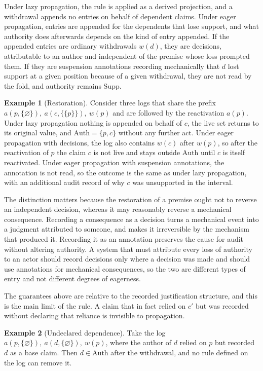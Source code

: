 \documentclass[11pt]{article}
\theoremstyle{plain}
\theoremstyle{definition}
\newtheorem{example}{Example}
\theoremstyle{remark}
\begin{document}
Under lazy propagation, the rule is applied as a derived projection, and a withdrawal appends no entries on behalf of dependent claims. Under eager propagation, entries are appended for the dependents that lose support, and what authority does afterwards depends on the kind of entry appended. If the appended entries are ordinary withdrawals $w(d)$, they are decisions, attributable to an author and independent of the premise whose loss prompted them. If they are suspension annotations recording mechanically that $d$ lost support at a given position because of a given withdrawal, they are not read by the fold, and authority remains $\mathrm{Supp}$.

\begin{example}[Restoration]
Consider three logs that share the prefix $a(p,\{\varnothing\}),\ a(c,\{\{p\}\}),\ w(p)$ and are followed by the reactivation $a(p)$. Under lazy propagation nothing is appended on behalf of $c$, the live set returns to its original value, and $\mathrm{Auth}=\{p,c\}$ without any further act. Under eager propagation with decisions, the log also contains $w(c)$ after $w(p)$, so after the reactivation of $p$ the claim $c$ is not live and stays outside $\mathrm{Auth}$ until $c$ is itself reactivated. Under eager propagation with suspension annotations, the annotation is not read, so the outcome is the same as under lazy propagation, with an additional audit record of why $c$ was unsupported in the interval.
\end{example}

The distinction matters because the restoration of a premise ought not to reverse an independent decision, whereas it may reasonably reverse a mechanical consequence. Recording a consequence as a decision turns a mechanical event into a judgment attributed to someone, and makes it irreversible by the mechanism that produced it. Recording it as an annotation preserves the cause for audit without altering authority. A system that must attribute every loss of authority to an actor should record decisions only where a decision was made and should use annotations for mechanical consequences, so the two are different types of entry and not different degrees of eagerness.

The guarantees above are relative to the recorded justification structure, and this is the main limit of the rule. A claim that in fact relied on $c'$ but was recorded without declaring that reliance is invisible to propagation.

\begin{example}[Undeclared dependence]
Take the log $a(p,\{\varnothing\}),\ a(d,\{\varnothing\}),\ w(p)$, where the author of $d$ relied on $p$ but recorded $d$ as a base claim. Then $d\in\mathrm{Auth}$ after the withdrawal, and no rule defined on the log can remove it.
\end{example}
\end{document}
